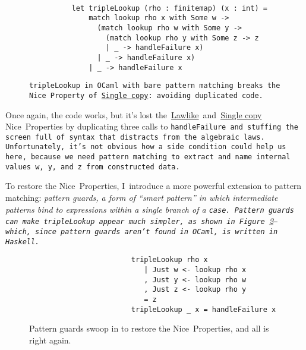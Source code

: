 \documentclass[manuscript,screen,review, 12pt, nonacm]{acmart}
\begin{document}
    \begin{figure}[ht]
        \begin{verbatim}

          let tripleLookup (rho : finitemap) (x : int) =
              match lookup rho x with Some w -> 
                (match lookup rho w with Some y -> 
                  (match lookup rho y with Some z -> z
                  | _ -> handleFailure x)
                | _ -> handleFailure x)
              | _ -> handleFailure x
            \end{verbatim}
        \caption{\tt{tripleLookup} in OCaml with bare pattern matching breaks
         the Nice~Property of~\hyperref[p2]{Single copy}: avoiding duplicated
         code.} 
                    
        \label{fig:pmtriplelookup}
    \end{figure}

    Once again, the code works, but it's lost
    the~\hyperref[p1]{Lawlike}~and~\hyperref[p2]{Single copy} Nice~Properties by
    duplicating three calls to \tt{handleFailure} and stuffing the screen full
    of syntax that distracts from the algebraic laws. Unfortunately, it's not
    obvious how a side condition could help us here, because we need pattern
    matching to extract and name internal values \tt{w}, \tt{y}, and~\tt{z}
    from constructed data.

    To restore the Nice~Properties, I~introduce a more powerful extension to
    pattern matching: \it{pattern guards}, a form of “smart pattern” in which
    intermediate patterns bind to expressions within a single branch of a
    \tt{case}. Pattern guards can make \tt{tripleLookup} appear \it{much}
    simpler, as shown in Figure~\ref{fig:guardtriplelookup}--- which, since
    pattern guards aren't found in OCaml, is written in Haskell.

    \begin{figure}
        \begin{center}
        \begin{verbatim}
                        tripleLookup rho x
                           | Just w <- lookup rho x
                           , Just y <- lookup rho w
                           , Just z <- lookup rho y
                           = z
                        tripleLookup _ x = handleFailure x
        \end{verbatim}
        \end{center}    
    \caption{Pattern guards swoop in to restore the Nice~Properties, and all is
    right again.} 
    \label{fig:guardtriplelookup}
    \end{figure}
\end{document}
